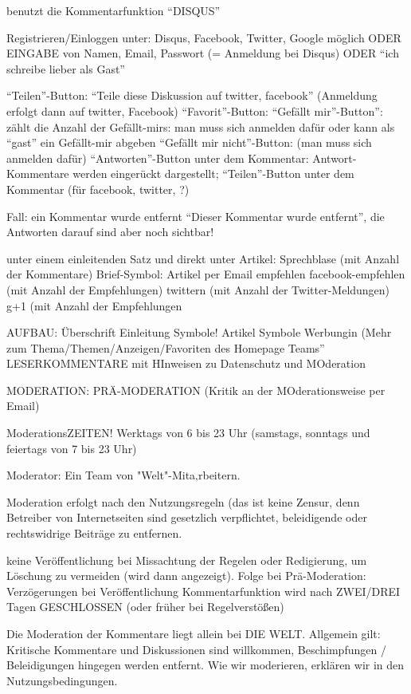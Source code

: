 benutzt die Kommentarfunktion ``DISQUS''

Registrieren/Einloggen unter: Disqus, Facebook, Twitter, Google möglich ODER EINGABE von Namen, Email, Passwort (= Anmeldung bei Disqus) ODER ``ich schreibe lieber als Gast''

``Teilen''-Button: ``Teile diese Diskussion auf twitter, facebook'' (Anmeldung erfolgt dann auf twitter, Facebook)
``Favorit''-Button: 
``Gefällt mir''-Button'': zählt die Anzahl der Gefällt-mirs: man muss sich anmelden dafür oder kann als ``gast'' ein Gefällt-mir abgeben
``Gefällt mir nicht''-Button: (man muss sich anmelden dafür)
``Antworten''-Button unter dem Kommentar: Antwort-Kommentare werden eingerückt dargestellt; 
``Teilen''-Button unter dem Kommentar (für facebook, twitter, ?)

Fall: ein Kommentar wurde entfernt ``Dieser Kommentar wurde entfernt'', die Antworten darauf sind aber noch sichtbar!

unter einem einleitenden Satz und direkt unter Artikel:
Sprechblase (mit Anzahl der Kommentare)
Brief-Symbol: Artikel per Email empfehlen
facebook-empfehlen (mit Anzahl der Empfehlungen)
twittern (mit Anzahl der Twitter-Meldungen)
g+1 (mit Anzahl der Empfehlungen


AUFBAU: 
Überschrift
Einleitung
Symbole!
Artikel
Symbole
Werbungin (Mehr zum Thema/Themen/Anzeigen/Favoriten des Homepage Teams''
LESERKOMMENTARE mit HInweisen zu Datenschutz und MOderation


MODERATION: PRÄ-MODERATION (Kritik an der MOderationsweise per Email)

ModerationsZEITEN! Werktags von 6 bis 23 Uhr (samstags, sonntags und feiertags von 7 bis 23 Uhr)

Moderator: Ein Team von "Welt"-Mita‚rbeitern.

Moderation erfolgt nach den Nutzungsregeln (das ist keine Zensur, denn Betreiber von Internetseiten sind gesetzlich verpflichtet, beleidigende oder rechtswidrige Beiträge zu entfernen.


keine Veröffentlichung bei Missachtung der Regelen oder Redigierung, um Löschung zu vermeiden (wird dann angezeigt).
Folge bei Prä-Moderation: Verzögerungen bei Veröffentlichung
Kommentarfunktion wird nach ZWEI/DREI Tagen GESCHLOSSEN (oder früher bei Regelverstößen)


Die Moderation der Kommentare liegt allein bei DIE WELT. Allgemein gilt: Kritische Kommentare und Diskussionen sind willkommen, Beschimpfungen / Beleidigungen hingegen werden entfernt. Wie wir moderieren, erklären wir in den Nutzungsbedingungen. 


